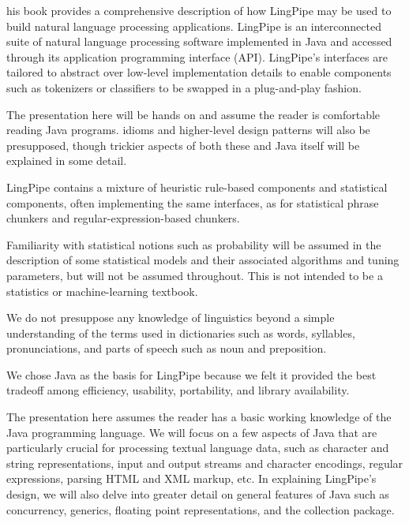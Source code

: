 
his book provides a comprehensive description of how
LingPipe may be used to build natural language processing
applications.  LingPipe is an interconnected suite of natural language
processing software implemented in Java and accessed through its
application programming interface (API).  LingPipe's interfaces are
tailored to abstract over low-level implementation details to enable
components such as tokenizers or classifiers to be swapped in a
plug-and-play fashion.

The presentation here will be hands on and assume the reader is
comfortable reading Java programs.  idioms and higher-level design
patterns will also be presupposed, though trickier aspects of both
these and Java itself will be explained in some detail.

LingPipe contains a mixture of heuristic rule-based components and
statistical components, often implementing the same interfaces, as for
statistical phrase chunkers and regular-expression-based chunkers.

Familiarity with statistical notions such as probability will be
assumed in the description of some statistical models and their
associated algorithms and tuning parameters, but will not be assumed
throughout.  This is not intended to be a statistics or
machine-learning textbook.

We do not presuppose any knowledge of linguistics beyond a simple
understanding of the terms used in dictionaries such as words,
syllables, pronunciations, and parts of speech such as noun and
preposition.




\noindent
We chose Java as the basis for LingPipe because we felt it provided
the best tradeoff among efficiency, usability, portability, and
library availability.

The presentation here assumes the reader has a basic working knowledge
of the Java programming language.  We will focus on a few aspects of
Java that are particularly crucial for processing textual language
data, such as character and string representations, input and output
streams and character encodings, regular expressions, parsing HTML and
XML markup, etc.  In explaining LingPipe's design, we will also delve
into greater detail on general features of Java such as concurrency,
generics, floating point representations, and the collection package.

